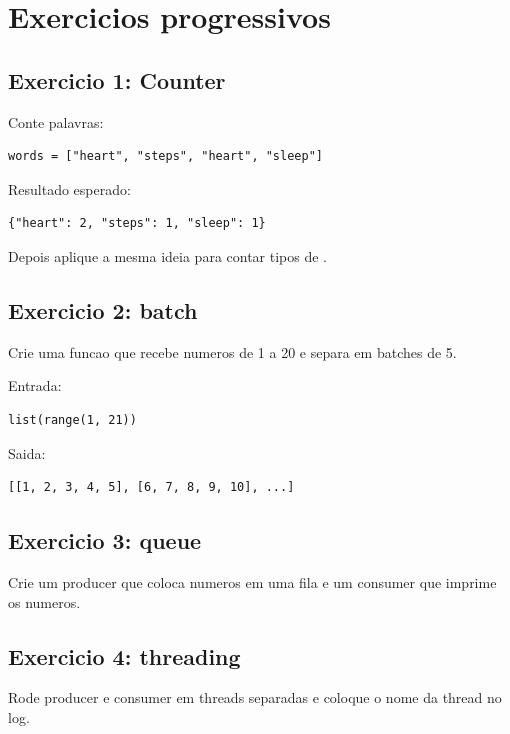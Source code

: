 \section{Exercicios progressivos}

\subsection{Exercicio 1: Counter}

Conte palavras:

\begin{lstlisting}[style=devbutterpython]
words = ["heart", "steps", "heart", "sleep"]
\end{lstlisting}

Resultado esperado:

\begin{lstlisting}[style=devbutterpython]
{"heart": 2, "steps": 1, "sleep": 1}
\end{lstlisting}

Depois aplique a mesma ideia para contar tipos de .

\subsection{Exercicio 2: batch}

Crie uma funcao que recebe numeros de 1 a 20 e separa em batches de 5.

Entrada:

\begin{lstlisting}[style=devbutterpython]
list(range(1, 21))
\end{lstlisting}

Saida:

\begin{lstlisting}[style=devbutterpython]
[[1, 2, 3, 4, 5], [6, 7, 8, 9, 10], ...]
\end{lstlisting}

\subsection{Exercicio 3: queue}

Crie um producer que coloca numeros em uma fila e um consumer que imprime os numeros.

\subsection{Exercicio 4: threading}

Rode producer e consumer em threads separadas e coloque o nome da thread no log.


